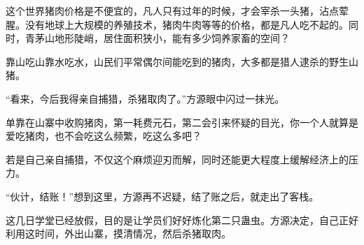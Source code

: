\begin{this_body}
这个世界猪肉价格是不便宜的，凡人只有过年的时候，才会宰杀一头猪，沾点荤腥。没有地球上大规模的养殖技术，猪肉牛肉等等的价格，都是凡人吃不起的。同时，青茅山地形陡峭，居住面积狭小，能有多少饲养家畜的空间？

靠山吃山靠水吃水，山民们平常偶尔间能吃到的猪肉，大多都是猎人逮杀的野生山猪。

“看来，今后我得亲自捕猎，杀猪取肉了。”方源眼中闪过一抹光。

单靠在山寨中收购猪肉，第一耗费元石，第二会引来怀疑的目光，你一个人就算是爱吃猪肉，也不会吃这么频繁，吃这么多吧？

若是自己亲自捕猎，不仅这个麻烦迎刃而解，同时还能更大程度上缓解经济上的压力。

“伙计，结账！”想到这里，方源再不迟疑，结了账之后，就走出了客栈。

这几日学堂已经放假，目的是让学员们好好炼化第二只蛊虫。方源决定，自己正好利用这时间，外出山寨，摸清情况，然后杀猪取肉。

\end{this_body}

